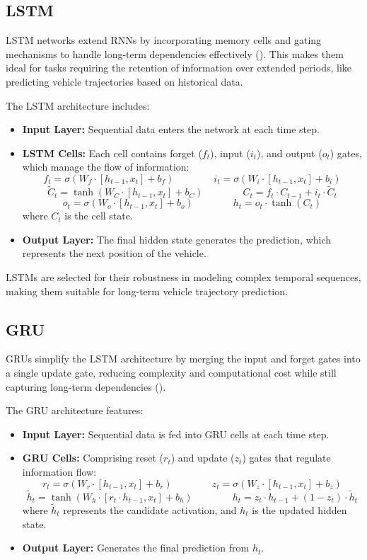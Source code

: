 \documentclass[journal,onecolumn]{IEEEtran}
\begin{document}
{\subsection{LSTM}
LSTM networks extend RNNs by incorporating memory cells and gating mechanisms to handle long-term dependencies effectively (\cite{6795963}). This makes them ideal for tasks requiring the retention of information over extended periods, like predicting vehicle trajectories based on historical data.

The LSTM architecture includes:
\begin{itemize}
    \item \textbf{Input Layer:} Sequential data enters the network at each time step.
    \item \textbf{LSTM Cells:} Each cell contains forget (\( f_t \)), input (\( i_t \)), and output  (\( o_t \)) gates, which manage the flow of information:
    \[
    f_t = \sigma(W_f \cdot [h_{t-1}, x_t] + b_f) \qquad \qquad i_t = \sigma(W_i \cdot [h_{t-1}, x_t] + b_i)
    \]
    \[
    \tilde{C}_t = \tanh(W_C \cdot [h_{t-1}, x_t] + b_C) \qquad \qquad C_t = f_t \cdot C_{t-1} + i_t \cdot \tilde{C}_t
    \]
    \[
    o_t = \sigma(W_o \cdot [h_{t-1}, x_t] + b_o) \qquad \qquad h_t = o_t \cdot \tanh(C_t)
    \]
    where \( C_t \) is the cell state.
    \item \textbf{Output Layer:} The final hidden state generates the prediction, which represents the next position of the vehicle.    
\end{itemize}

LSTMs are selected for their robustness in modeling complex temporal sequences, making them suitable for long-term vehicle trajectory prediction.

\subsection{GRU}
GRUs simplify the LSTM architecture by merging the input and forget gates into a single update gate, reducing complexity and computational cost while still capturing long-term dependencies (\cite{prep23ghojogh}).

The GRU architecture features:
\begin{itemize}
    \item \textbf{Input Layer:} Sequential data is fed into GRU cells at each time step.
    \item \textbf{GRU Cells:} Comprising reset (\( r_t \)) and update (\( z_t \)) gates that regulate information flow:
    \[
    r_t = \sigma(W_r \cdot [h_{t-1}, x_t] + b_r)  \qquad \qquad z_t = \sigma(W_z \cdot [h_{t-1}, x_t] + b_z)
    \]
    \[
    \tilde{h}_t = \tanh(W_h \cdot [r_t \cdot h_{t-1}, x_t] + b_h)  \qquad \qquad h_t = z_t \cdot h_{t-1} + (1 - z_t) \cdot \tilde{h}_t
    \]
    where \( \tilde{h}_t \) represents the candidate activation, and \( h_t \) is the updated hidden state.
    \item \textbf{Output Layer:} Generates the final prediction from \( h_t \).
\end{itemize}

}
\end{document}
